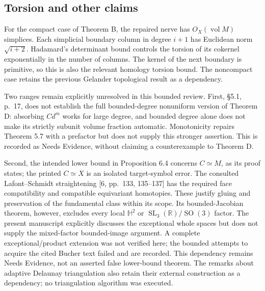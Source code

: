 \documentclass[10pt]{article}
\begin{document}
\subsection*{Torsion and other claims}
For the compact case of Theorem B, the repaired nerve has \(O_X(\operatorname{vol}M)\) simplices. Each simplicial boundary column in degree \(i+1\) has Euclidean norm \(\sqrt{i+2}\). Hadamard’s determinant bound controls the torsion of its cokernel exponentially in the number of columns. The kernel of the next boundary is primitive, so this is also the relevant homology torsion bound. The noncompact case retains the previous Gelander topological result as a dependency.\par
Two ranges remain explicitly unresolved in this bounded review. First, §5.1, p. 17, does not establish the full bounded-degree nonuniform version of Theorem D: absorbing \(Cd^m\) works for large degree, and bounded degree alone does not make its strictly subunit volume fraction automatic. Monotonicity repairs Theorem 5.7 with a prefactor but does not supply this stronger assertion. This is recorded as Needs Evidence, without claiming a counterexample to Theorem D.\par
Second, the intended lower bound in Proposition 6.4 concerns \(C\simeq M\), as its proof states; the printed \(C\simeq X\) is an isolated target-symbol error. The consulted Lafont–Schmidt straightening [6, pp. 133, 135–137] has the required face compatibility and compatible equivariant homotopies. These justify gluing and preservation of the fundamental class within its scope. Its bounded-Jacobian theorem, however, excludes every local \(\mathbb H^2\) or \(\operatorname{SL}_3(\mathbb R)/\operatorname{SO}(3)\) factor. The present manuscript explicitly discusses the exceptional whole spaces but does not supply the mixed-factor bounded-image argument. A complete exceptional/product extension was not verified here; the bounded attempts to acquire the cited Bucher text failed and are recorded. This dependency remains Needs Evidence, not an asserted false lower-bound theorem. The remarks about adaptive Delaunay triangulation also retain their external construction as a dependency; no triangulation algorithm was executed.\par
\end{document}

